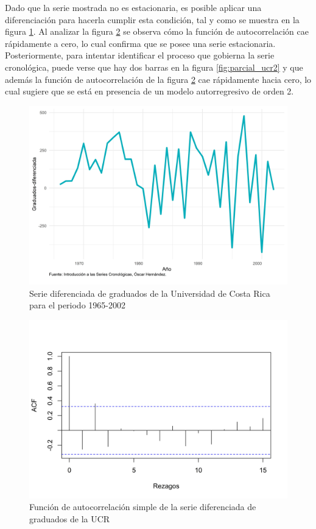 \documentclass[
]{article}
\begin{document}
Dado que la serie mostrada no es estacionaria, es posible aplicar una
diferenciación para hacerla cumplir esta condición, tal y como se
muestra en la figura \ref{fig:ejemplo_ucr_diferenciada}. Al analizar la
figura \ref{fig:auto_ucr2} se observa cómo la función de autocorrelación
cae rápidamente a cero, lo cual confirma que se posee una serie
estacionaria. Posteriormente, para intentar identificar el proceso que
gobierna la serie cronológica, puede verse que hay dos barras en la
figura \ref{fig:parcial_ucr2} y que además la función de autocorrelación
de la figura \ref{fig:auto_ucr2} cae rápidamente hacia cero, lo cual
sugiere que se está en presencia de un modelo autorregresivo de orden 2.

\begin{figure}[H]
\includegraphics[width=1\linewidth,height=1\textheight]{Tesis_files/figure-latex/ejemplo_ucr_diferenciada-1} \caption{Serie diferenciada de graduados de la Universidad de Costa Rica para el periodo 1965-2002}\label{fig:ejemplo_ucr_diferenciada}
\end{figure}

\begin{figure}[H]
\includegraphics[width=1\linewidth,height=1\textheight]{Tesis_files/figure-latex/auto_ucr2-1} \caption{Función de autocorrelación simple de la serie diferenciada de graduados de la UCR}\label{fig:auto_ucr2}
\end{figure}
\end{document}
